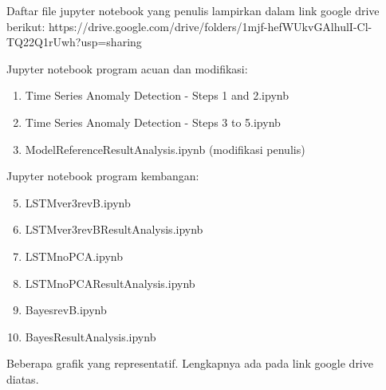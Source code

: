 \documentclass[12pt, a4paper, onecolumn, oneside, final]{report}
\begin{document}
    Daftar file jupyter notebook yang penulis lampirkan dalam link google drive berikut:
    https://drive.google.com/drive/folders/1mjf-hefWUkvGAlhulI-Cl-TQ22Q1rUwh?usp=sharing

    Jupyter notebook program acuan dan modifikasi:
    \begin{enumerate}[label=\textbf{L.\arabic*}]
        \item Time Series Anomaly Detection -  Steps 1 and 2.ipynb
        \item Time Series Anomaly Detection - Steps 3 to 5.ipynb
        \item Model\textunderscore Reference\textunderscore Result\textunderscore Analysis.ipynb (modifikasi penulis) \label{refmodified_ipynb}
    \end{enumerate}

    Jupyter notebook program kembangan:
    \begin{enumerate}[label=\textbf{L.\arabic*}]
        \setcounter{enumi}{4}
        \item LSTM\textunderscore ver3\textunderscore revB.ipynb \label{lstm_pca_ipynb}
        \item LSTM\textunderscore ver3\textunderscore revB\textunderscore Result\textunderscore Analysis.ipynb \label{lstm_pca_res_ipynb}
        \item LSTM\textunderscore noPCA.ipynb \label{lstm_nopca_ipynb}
        \item LSTM\textunderscore noPCA\textunderscore Result\textunderscore Analysis.ipynb \label{lstm_pca_res_ipynb}
        \item Bayes\textunderscore revB.ipynb \label{bayes_ipynb}
        \item Bayes\textunderscore Result\textunderscore Analysis.ipynb \label{lstm_pca_res_ipynb}
    \end{enumerate}

    Beberapa grafik yang representatif. Lengkapnya ada pada link google drive diatas.
\end{document}
